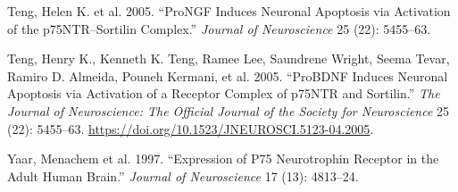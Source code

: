 \documentclass[
  letterpaper,
  DIV=11,
  numbers=noendperiod]{scrreprt}
\newlength{\cslhangindent}
\newenvironment{CSLReferences}[2] %
 {\begin{list}{}{%
  \setlength{\itemindent}{0pt}
  \setlength{\leftmargin}{0pt}
  \setlength{\parsep}{0pt}
  \ifodd #1
   \setlength{\leftmargin}{\cslhangindent}
   \setlength{\itemindent}{-1\cslhangindent}
  \fi
  \setlength{\itemsep}{#2\baselineskip}}}
 {\end{list}}
\begin{document}
\begin{CSLReferences}{1}{0}
Teng, Helen K. et al. 2005. {``{ProNGF} Induces Neuronal Apoptosis via
Activation of the {p75NTR}--Sortilin Complex.''} \emph{Journal of
Neuroscience} 25 (22): 5455--63.

Teng, Henry K., Kenneth K. Teng, Ramee Lee, Saundrene Wright, Seema
Tevar, Ramiro D. Almeida, Pouneh Kermani, et al. 2005. {``{ProBDNF}
Induces Neuronal Apoptosis via Activation of a Receptor Complex of
{p75NTR} and Sortilin.''} \emph{The Journal of Neuroscience: The
Official Journal of the Society for Neuroscience} 25 (22): 5455--63.
\url{https://doi.org/10.1523/JNEUROSCI.5123-04.2005}.

Yaar, Menachem et al. 1997. {``Expression of P75 Neurotrophin Receptor
in the Adult Human Brain.''} \emph{Journal of Neuroscience} 17 (13):
4813--24.

\end{CSLReferences}
\end{document}
